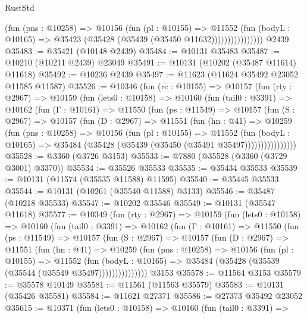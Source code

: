 \begin{lexlean}{RustStd}
\begin{coremodule}
                        (fun (pns : @10258) =>
                        @10156
                          (fun (pl : @10155) =>
                          @11552
                            (fun (bodyL : @10165) =>
                            @35423 (@35428 (@35439 (@35450 @11632))))))))))))))))
    @2439
@35483 := @35421 (@10148 @2439)
@35484 := @10131 @35483
@35487 := @10210 (@10211 @2439) @23049
@35491 := @10131 (@10202 (@35487 @11614) @11618)
@35492 := @10236 @2439
@35497 := @11623 (@11624 @35492 @23052 @11585 @11587)
@35526 := @10346
    (fun (rc : @10155) =>
    @10157
      (fun (rty : @2967) =>
      @10159
        (fun (lets0 : @10158) =>
        @10160
          (fun (tail0 : @3391) =>
          @10162
            (fun (Γ : @10161) =>
            @11550
              (fun (ps : @11549) =>
              @10157
                (fun (S : @2967) =>
                @10157
                  (fun (D : @2967) =>
                  @11551
                    (fun (hn : @41) =>
                    @10259
                      (fun (pns : @10258) =>
                      @10156
                        (fun (pl : @10155) =>
                        @11552
                          (fun (bodyL : @10165) =>
                          @35484 (@35428 (@35439 (@35450 (@35491 @35497))))))))))))))))
@35528 := @3360 (@3726 @3153)
@35533 := @7880 (@35528 (@3360 (@3729 @3001) @3370))
@35534 := @35526 @35533
@35535 := @35434 @35533
@35539 := @10131 (@11574 (@35535 @11588) @11595)
@35540 := @35445 @35533
@35544 := @10131 (@10261 (@35540 @11588) @3133)
@35546 := @35487 (@10218 @35533)
@35547 := @10202 @35546
@35549 := @10131 (@35547 @11618)
@35577 := @10349
    (fun (rty : @2967) =>
    @10159
      (fun (lets0 : @10158) =>
      @10160
        (fun (tail0 : @3391) =>
        @10162
          (fun (Γ : @10161) =>
          @11550
            (fun (ps : @11549) =>
            @10157
              (fun (S : @2967) =>
              @10157
                (fun (D : @2967) =>
                @11551
                  (fun (hn : @41) =>
                  @10259
                    (fun (pns : @10258) =>
                    @10156
                      (fun (pl : @10155) =>
                      @11552
                        (fun (bodyL : @10165) =>
                        @35484 (@35428 (@35539 (@35544 (@35549 @35497)))))))))))))))
    @3153
@35578 := @11564 @3153
@35579 := @35578 @10149
@35581 := @11561 (@11563 @35579)
@35583 := @10131 (@35426 @35581)
@35584 := @11621 @27371
@35586 := @27373 @35492 @23052
@35615 := @10371
    (fun (lets0 : @10158) =>
    @10160
      (fun (tail0 : @3391) =>

\end{coremodule}
\end{lexlean}
